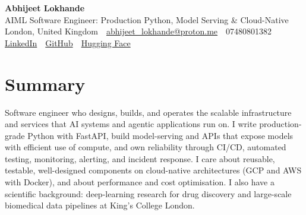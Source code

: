 \documentclass[10pt,a4paper]{article}
\newcommand{\sep}{\,\textcolor{accent!60}{\textbar}\,}
\begin{document}
\begin{center}
  {\fontsize{24}{26}\selectfont\bfseries Abhijeet Lokhande}\\[3pt]
  {\color{accent}\large AIML Software Engineer: Production Python, Model Serving \& Cloud-Native}\\[5pt]
  {\small
    London, United Kingdom \sep
    \href{mailto:abhijeet_lokhande@proton.me}{abhijeet\_lokhande@proton.me} \sep
    07480801382 \\[2pt]
    \href{https://www.linkedin.com/in/ablds/}{LinkedIn} \sep
    \href{https://github.com/abhijeetscode}{GitHub} \sep
    \href{https://huggingface.co/ab-ai}{Hugging Face}
  }
\end{center}
\vspace{2pt}

\section{Summary}
Software engineer who designs, builds, and operates the scalable infrastructure and services that AI systems and agentic applications run on. I write production-grade Python with FastAPI, build model-serving and APIs that expose models with efficient use of compute, and own reliability through CI/CD, automated testing, monitoring, alerting, and incident response. I care about reusable, testable, well-designed components on cloud-native architectures (GCP and AWS with Docker), and about performance and cost optimisation. I also have a scientific background: deep-learning research for drug discovery and large-scale biomedical data pipelines at King's College London.

\end{document}
